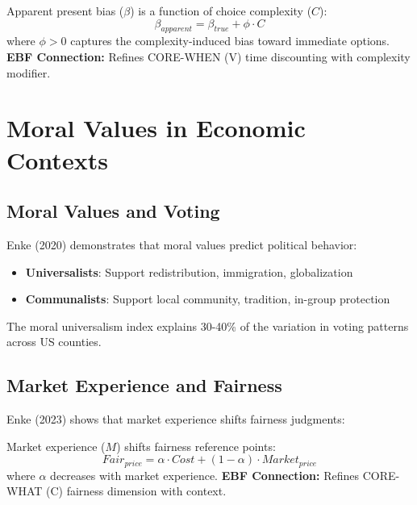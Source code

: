 \begin{axiom}
\label{ax:be5}
Apparent present bias ($\beta$) is a function of choice complexity ($C$):
\begin{equation}
\beta_{apparent} = \beta_{true} + \phi \cdot C
\end{equation}
where $\phi > 0$ captures the complexity-induced bias toward immediate options.
\textbf{EBF Connection:} Refines CORE-WHEN (V) time discounting with complexity modifier.
\end{axiom}

\section{Moral Values in Economic Contexts}

\subsection{Moral Values and Voting}

Enke (2020) demonstrates that moral values predict political behavior:

\begin{itemize}
    \item \textbf{Universalists}: Support redistribution, immigration, globalization
    \item \textbf{Communalists}: Support local community, tradition, in-group protection
\end{itemize}

The moral universalism index explains 30-40\% of the variation in voting patterns across US counties.

\subsection{Market Experience and Fairness}

Enke (2023) shows that market experience shifts fairness judgments:

\begin{axiom}
\label{ax:be6}
Market experience ($M$) shifts fairness reference points:
\begin{equation}
Fair_{price} = \alpha \cdot Cost + (1-\alpha) \cdot Market_{price}
\end{equation}
where $\alpha$ decreases with market experience.
\textbf{EBF Connection:} Refines CORE-WHAT (C) fairness dimension with context.
\end{axiom}

